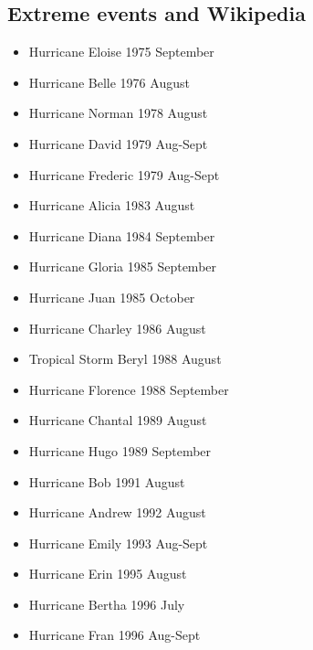 \subsection{Extreme events and Wikipedia}
\begin{itemize}
\item Hurricane Eloise 1975 September
\item Hurricane Belle 1976 August
\item Hurricane Norman 1978 August
\item Hurricane David 1979 Aug-Sept
\item Hurricane Frederic 1979 Aug-Sept
\item Hurricane Alicia 1983 August
\item Hurricane Diana 1984 September
\item Hurricane Gloria 1985 September
\item Hurricane Juan	1985 October
\item Hurricane Charley 1986 August
\item Tropical Storm Beryl 1988 August
\item Hurricane Florence 1988 September	
\item Hurricane Chantal 1989 August
\item Hurricane Hugo 1989 September
\item Hurricane Bob 1991 August
\item Hurricane Andrew 1992 August
\item Hurricane Emily 1993 Aug-Sept
\item Hurricane Erin 1995 August
\item Hurricane Bertha 1996 July
\item Hurricane Fran 1996 Aug-Sept
\end{itemize}
